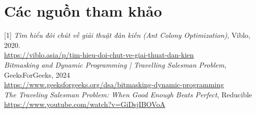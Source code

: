 \documentclass[11pt,a4paper,openany]{report}
\begin{document}
\section{Các nguồn tham khảo}
[1] \textit{Tìm hiểu đôi chút về giải thuật đàn kiến (Ant Colony Optimization)},
Viblo, 2020.\\
\href{https://viblo.asia/p/tim-hieu-doi-chut-ve-giai-thuat-dan-kien-ant-colony-optimization-algorithms-3P0lPQ1o5ox}{https://viblo.asia/p/tim-hieu-doi-chut-ve-giai-thuat-dan-kien}\\[3pt]
\noindent [2] \textit{Bitmasking and Dynamic Programming | Travelling Salesman Problem}, GeeksForGeeks, 2024\\
\href{https://www.geeksforgeeks.org/dsa/bitmasking-dynamic-programming-set-2-tsp/}{https://www.geeksforgeeks.org/dsa/bitmasking-dynamic-programming}\\[3pt]
\noindent [3] \textit{The Traveling Salesman Problem: When Good Enough Beats Perfect}, Reducible\\
\href{https://www.youtube.com/watch?v=GiDsjIBOVoA}{https://www.youtube.com/watch?v=GiDsjIBOVoA}
\end{document}
